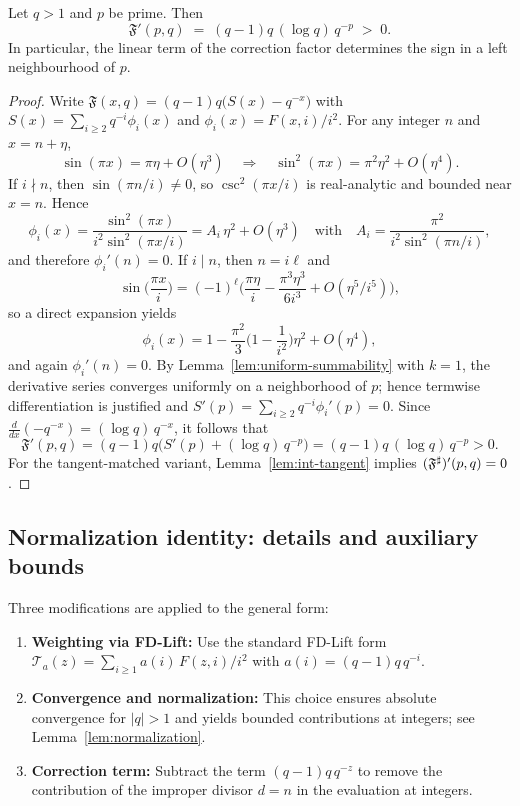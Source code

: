\begin{lemma}\label{lem:derivative-at-prime}
Let $q>1$ and $p$ be prime. Then
\[
\mathfrak F'(p,q)\;=\;(q-1)q\,(\log q)\,q^{-p}\;>\;0.
\]
In particular, the linear term of the correction factor determines the sign in a left neighbourhood of $p$.
\end{lemma}
\begin{proof}
Write $\mathfrak F(x,q)=(q-1)q\big(S(x)-q^{-x}\big)$ with $S(x)=\sum_{i\ge2}q^{-i}\phi_i(x)$ and $\phi_i(x)=F(x,i)/i^2$. For any integer $n$ and $x=n+\eta$,
\[
\sin(\pi x)=\pi\eta+O(\eta^3)\quad\Rightarrow\quad \sin^2(\pi x)=\pi^2\eta^2+O(\eta^4).
\]
If $i\nmid n$, then $\sin(\pi n/i)\neq 0$, so $\csc^2(\pi x/i)$ is real-analytic and bounded near $x=n$. Hence
\[
\phi_i(x)=\frac{\sin^2(\pi x)}{i^2\sin^2(\pi x/i)}=A_i\,\eta^2+O(\eta^3)\quad\text{with}\quad A_i=\frac{\pi^2}{i^2\sin^2(\pi n/i)},
\]
and therefore $\phi_i'(n)=0$. If $i\mid n$, then $n=i\ell$ and
\[
\sin\!\Big(\frac{\pi x}{i}\Big)=(-1)^\ell\Big(\frac{\pi\eta}{i}-\frac{\pi^3\eta^3}{6i^3}+O(\eta^5/i^5)\Big),
\]
so a direct expansion yields
\[
\phi_i(x)=1-\frac{\pi^2}{3}\Big(1-\frac{1}{i^2}\Big)\eta^2+O(\eta^4),
\]
and again $\phi_i'(n)=0$. By Lemma~\ref{lem:uniform-summability} with $k=1$, the derivative series converges uniformly on a neighborhood of $p$; hence termwise differentiation is justified and $S'(p)=\sum_{i\ge2}q^{-i}\phi_i'(p)=0$. Since $\frac{d}{dx}(-q^{-x})=(\log q)\,q^{-x}$, it follows that
\[
\mathfrak F'(p,q)=(q-1)q\Big(S'(p)+(\log q)\,q^{-p}\Big)=(q-1)q\,(\log q)\,q^{-p}>0.
\]
For the tangent-matched variant, Lemma~\ref{lem:int-tangent} implies $(\mathfrak F^{\sharp})'(p,q)=0$.
\end{proof}

\subsection{Normalization identity: details and auxiliary bounds}\label{app:prime-construction}
Three modifications are applied to the general form:
\begin{enumerate}
    \item \textbf{Weighting via FD-Lift:} Use the standard FD-Lift form $\mathcal{T}_a(z)=\sum_{i\ge1} a(i)\,F(z,i)/i^2$ with $a(i)=(q-1)q\,q^{-i}$.
    \item \textbf{Convergence and normalization:} This choice ensures absolute convergence for $|q|>1$ and yields bounded contributions at integers; see Lemma~\ref{lem:normalization}.
    \item \textbf{Correction term:} Subtract the term $(q-1)q\,q^{-z}$ to remove the contribution of the improper divisor $d=n$ in the evaluation at integers.
\end{enumerate}

